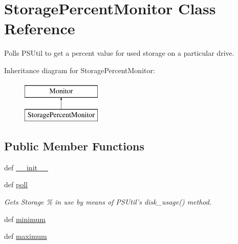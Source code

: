 \hypertarget{classsrc_1_1client_1_1_storage_percent_monitor_1_1_storage_percent_monitor}{\section{Storage\-Percent\-Monitor Class Reference}
\label{classsrc_1_1client_1_1_storage_percent_monitor_1_1_storage_percent_monitor}
}


Polls P\-S\-Util to get a percent value for used storage on a particular drive.  


Inheritance diagram for Storage\-Percent\-Monitor\-:\begin{figure}[H]
\begin{center}
\leavevmode
\includegraphics[height=2.000000cm]{classsrc_1_1client_1_1_storage_percent_monitor_1_1_storage_percent_monitor}
\end{center}
\end{figure}
\subsection*{Public Member Functions}
\begin{DoxyCompactItemize}
\item 
def \hyperlink{classsrc_1_1client_1_1_storage_percent_monitor_1_1_storage_percent_monitor_ac775ee34451fdfa742b318538164070e}{\-\_\-\-\_\-init\-\_\-\-\_\-}
\item 
def \hyperlink{classsrc_1_1client_1_1_storage_percent_monitor_1_1_storage_percent_monitor_a87cd0076a6d482a01482f25a64cf2fb4}{poll}
\begin{DoxyCompactList}\small\item\em Gets Storage \% in use by means of P\-S\-Util's disk\-\_\-usage() method. \end{DoxyCompactList}\item 
def \hyperlink{classsrc_1_1client_1_1_storage_percent_monitor_1_1_storage_percent_monitor_a4515aa6e0be4391413959391fef1109f}{minimum}
\item 
def \hyperlink{classsrc_1_1client_1_1_storage_percent_monitor_1_1_storage_percent_monitor_a8f6589fdc9d322ec8e0dc2c7ede55ce9}{maximum}
\end{DoxyCompactItemize}


